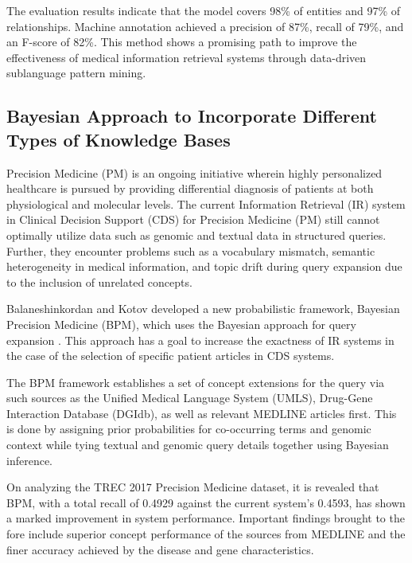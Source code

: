 \documentclass[conference]{IEEEtran}
\begin{document}
The evaluation results indicate that the model covers 98\% of entities and 97\% of relationships. Machine annotation achieved a precision of 87\%, recall of 79\%, and an F-score of 82\%. This method shows a promising path to improve the effectiveness of medical information retrieval systems through data-driven sublanguage pattern mining.

\subsection{Bayesian Approach to Incorporate Different Types of Knowledge Bases}

Precision Medicine (PM) \cite{Collins2015} is an ongoing initiative wherein highly personalized healthcare is pursued by providing differential diagnosis of patients at both physiological and molecular levels. The current Information Retrieval (IR) system in Clinical Decision Support (CDS) for Precision Medicine (PM) still cannot optimally utilize data such as genomic and textual data in structured queries. Further, they encounter problems such as a vocabulary mismatch, semantic heterogeneity in medical information, and topic drift during query expansion due to the inclusion of unrelated concepts.

Balaneshinkordan and Kotov developed a new probabilistic framework, Bayesian Precision Medicine (BPM), which uses the Bayesian approach for query expansion \cite{Balaneshinkordan2019}. This approach has a goal to increase the exactness of IR systems in the case of the selection of specific patient articles in CDS systems.

The BPM framework establishes a set of concept extensions for the query via such sources as the Unified Medical Language System (UMLS), Drug-Gene Interaction Database (DGIdb), as well as relevant MEDLINE articles first. This is done by assigning prior probabilities for co-occurring terms and genomic context while tying textual and genomic query details together using Bayesian inference.

On analyzing the TREC 2017 Precision Medicine dataset, it is revealed that BPM, with a total recall of 0.4929 against the current system's 0.4593, has shown a marked improvement in system performance. Important findings brought to the fore include superior concept performance of the sources from MEDLINE and the finer accuracy achieved by the disease and gene characteristics.


\end{document}
